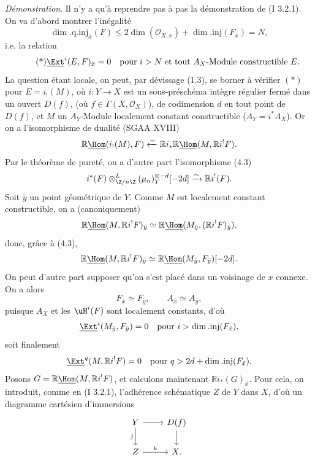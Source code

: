 \emph{Démonstration}. Il n'y a qu'à reprendre pas à pas la démonstration de (I 3.2.1). On va d'abord montrer l'inégalité
\[
        \dim.\mathrm{q.inj}_{\bar{x}}(F)\leq 2\dim(\mathcal{O}_{X,x})+\dim.\mathrm{inj}(F_{\bar{x}})=N,
\]
i.e. la relation
\begin{equation}\tag{*}
        \underline{\Ext}^{i}(E,F)_{\bar{x}}=0\quad\hbox{pour } i>N\hbox{ et tout }A_X\hbox{-Module constructible }E.
\end{equation}
La question étant locale, on peut, par dévissage (1.3), se borner à vérifier $(*)$ pour $E=i_!(M)$, où $i:Y\to X$ est un sous-préschéma intègre régulier fermé dans un ouvert $D(f)$, (où $f\in\Gamma(X,\mathcal{O}_X)$), de codimension $d$ en tout point de $D(f)$, et $M$ un $A_Y$-Module localement constant constructible ($A_Y=i^*A_X$).
Or on a l'isomorphisme de dualité (SGAA XVIII)
\[
        \mathbb{R}\underline{\Hom}(i_!(M),F)\xleftarrow{\sim} \mathbb{R} i_*\mathbb{R}\underline{\Hom}(M,\mathbb{R} i^!F).
\]
Par le théorème de pureté, on a d'autre part l'isomorphisme (4.3)
\[
        i^*(F)\otimes^L_{\Z/n\Z}(\mu_n)_Y^{\otimes -d}[-2d]\xrightarrow{\sim}\mathbb{R} i^!(F).
\]
Soit $\bar{y}$ un point géométrique de $Y$. Comme $M$ est localement constant constructible, on a (canoniquement)
\[
        \mathbb{R}\underline{\Hom}(M,\mathrm{R} i^!F)_{\bar{y}}\simeq \mathbb{R}\underline{\Hom}(M_{\bar{y}},(\mathbb{R} i^!F)_{\bar{y}}),
\]
donc, grâce à (4.3),
\[
        \mathbb{R}\underline{\Hom}(M,\mathbb{R} i^!F)_{\bar{y}}\simeq \mathbb{R}\underline{\Hom}(M_{\bar{y}},F_{\bar{y}})[-2d].
\]
On peut d'autre part supposer qu'on s'est placé dans un voisinage de $x$ connexe. On a alors
\[
        F_{\bar{x}}\simeq F_{\bar{y}},\qquad A_{\bar{x}}\simeq A_{\bar{y}},
\]
puisque $A_X$ et les $\uH^i(F)$ sont localement constants, d'où
\[
        \underline{\Ext}^i(M_{\bar{y}},F_{\bar{y}})=0\quad\hbox{pour }i>\dim.\mathrm{inj}(F_{\bar{x}}),
\]
soit finalement
\[
        \underline{\Ext}^{q}(M,\mathbb{R} i^!F)=0\quad\hbox{pour }q>2d+\dim.\mathrm{inj}(F_{\bar{x}}).
\]
Posons $G=\mathbb{R}\underline{\Hom}(M,\mathbb{R} i^!F)$, et calculons maintenant $\mathbb{R} i_*(G)_{\bar{x}}$. Pour cela, on introduit, comme en (I 3.2.1), l'adhérence schématique $Z$ de $Y$ dans $X$, d'où un diagramme cartésien d'immersions
\[
\begin{tikzcd}
Y \arrow[r] \arrow[d,"j"'] & D(f) \arrow[d]\\
Z \arrow[r,"k"] & X.
\end{tikzcd}
\]
